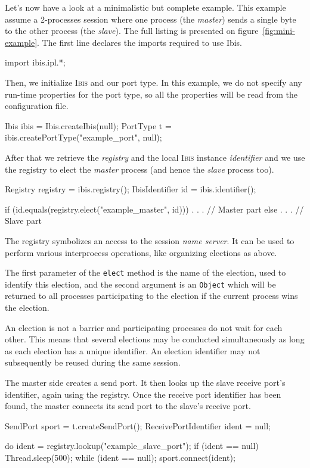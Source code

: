 \documentclass[11pt]{book}
\def\Ibis{\textsc{Ibis}\xspace}
\begin{document}
Let's now have a look at a minimalistic but complete example. This
example assume a 2-processes session where one process (the
\emph{master}) sends a single byte to the other process (the
\emph{slave}). The full listing is presented on
figure~\ref{fig:mini-example}. The first line declares the imports
required to use Ibis.
\begin{Miniverb}
import ibis.ipl.*;
\end{Miniverb}

Then, we initialize \Ibis and our port type. In this example, we do
not specify any run-time properties for the port type, so all the
properties will be read from the configuration file.
\begin{Miniverb}
      Ibis ibis  = Ibis.createIbis(null);
      PortType t = ibis.createPortType("example_port", null);
\end{Miniverb}

After that we retrieve the \emph{registry} and the local \Ibis
instance \emph{identifier} and we use the registry to elect the
\emph{master} process (and hence the \emph{slave} process too).
\begin{Miniverb}
      Registry registry = ibis.registry();
      IbisIdentifier id = ibis.identifier();

      if (id.equals(registry.elect("example_master", id))) {
        . . .  // Master part
      } else {
        . . .  // Slave  part
      }
\end{Miniverb}
The registry symbolizes an access to the session \emph{name server}.
It can be used to perform various interprocess operations, like
organizing elections as above.

The first parameter of the \texttt{elect} method is the name of the
election, used to identify this election, and the second argument is
an \texttt{Object} which will be returned to all processes
participating to the election if the current process wins the
election.

An election is not a barrier and participating processes do not wait
for each other. This means that several elections may be conducted
simultaneously as long as each election has a unique identifier. An
election identifier may not subsequently be reused during the same
session.

The master side creates a send port. It then looks up the slave
receive port's identifier, again using the registry. Once the receive
port identifier has been found, the master connects its send port to
the slave's receive port.
\begin{Miniverb}
        SendPort sport = t.createSendPort();
        ReceivePortIdentifier ident = null;

        do {
          ident = registry.lookup("example_slave_port");
          if (ident == null) {
            Thread.sleep(500);
          }
        } while (ident == null);
        sport.connect(ident);
\end{Miniverb}
\end{document}
